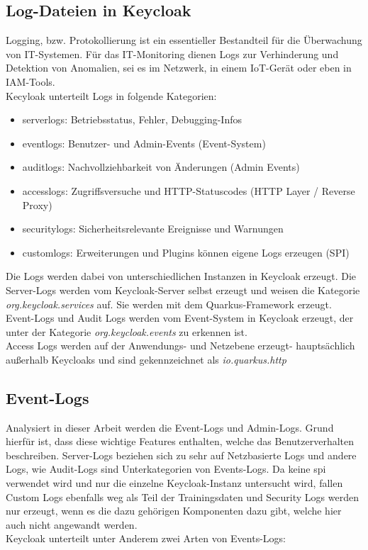 \documentclass[a4paper,12pt]{article}
\begin{document}
	\subsection{Log-Dateien in Keycloak}
	Logging, bzw. Protokollierung ist ein essentieller Bestandteil für die Überwachung von IT-Systemen. Für das IT-Monitoring dienen Logs zur Verhinderung und Detektion von Anomalien, sei es im Netzwerk, in einem IoT-Gerät oder eben in IAM-Tools. 
	\\[0.5em]
	Kecyloak unterteilt Logs in folgende Kategorien:
	\begin{itemize}
		\item \gls{serverlogs}: Betriebsstatus, Fehler, Debugging-Infos
		\item \gls{eventlogs}: Benutzer- und Admin-Events (Event-System)
		\item \gls{auditlogs}: Nachvollziehbarkeit von Änderungen (Admin Events)
		\item \gls{accesslogs}: Zugriffsversuche und HTTP-Statuscodes (HTTP Layer / Reverse Proxy)
		\item \gls{securitylogs}: Sicherheitsrelevante Ereignisse und Warnungen
		\item \gls{customlogs}: Erweiterungen und Plugins können eigene Logs erzeugen (SPI)
	\end{itemize}
	Die Logs werden dabei von unterschiedlichen Instanzen in Keycloak erzeugt. Die Server-Logs werden  vom Keycloak-Server selbst erzeugt und weisen die Kategorie \textit{org.keycloak.services} auf. Sie werden mit dem Quarkus-Framework erzeugt.
	\\[0.5em]
	Event-Logs und Audit Logs werden vom Event-System in Keycloak erzeugt, der unter der Kategorie \textit{org.keycloak.events} zu erkennen ist.
	\\[0.5em]
	Access Logs werden auf der Anwendungs- und Netzebene erzeugt- hauptsächlich außerhalb Keycloaks und sind gekennzeichnet als \textit{io.quarkus.http}
	
	\subsection{Event-Logs}
	Analysiert in dieser Arbeit werden die Event-Logs und Admin-Logs. Grund hierfür ist, dass diese wichtige Features enthalten, welche das Benutzerverhalten beschreiben. Server-Logs beziehen sich zu sehr auf Netzbasierte Logs und andere Logs, wie Audit-Logs sind Unterkategorien von Events-Logs. Da keine \gls{spi} verwendet wird und nur die einzelne Keycloak-Instanz untersucht wird, fallen Custom Logs ebenfalls weg als Teil der Trainingsdaten und Security Logs werden nur erzeugt, wenn es die dazu gehörigen Komponenten dazu gibt, welche hier auch nicht angewandt werden.
	\\[0.5em]
	Keycloak unterteilt unter Anderem zwei Arten von Events-Logs:
	
\end{document}
